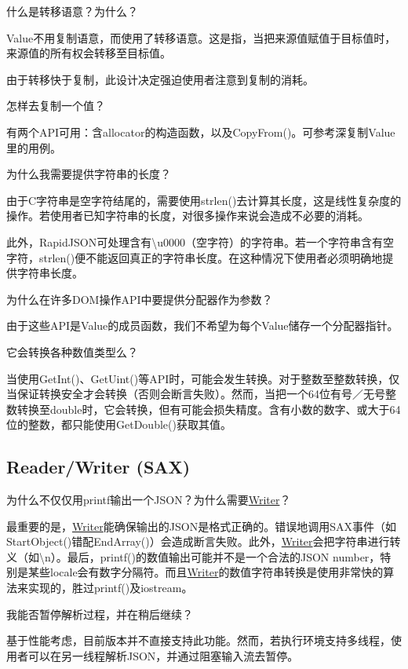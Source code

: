 \begin{DoxyEnumerate}
\item 什么是转移语意？为什么？

{\ttfamily Value}不用复制语意，而使用了转移语意。这是指，当把来源值赋值于目标值时，来源值的所有权会转移至目标值。

由于转移快于复制，此设计决定强迫使用者注意到复制的消耗。
\item 怎样去复制一个值？

有两个\+A\+P\+I可用：含allocator的构造函数，以及{\ttfamily Copy\+From()}。可参考深复制\+Value里的用例。
\item 为什么我需要提供字符串的长度？

由于\+C字符串是空字符结尾的，需要使用{\ttfamily strlen()}去计算其长度，这是线性复杂度的操作。若使用者已知字符串的长度，对很多操作来说会造成不必要的消耗。

此外，\+Rapid\+J\+S\+O\+N可处理含有{\ttfamily \textbackslash{}u0000}（空字符）的字符串。若一个字符串含有空字符，{\ttfamily strlen()}便不能返回真正的字符串长度。在这种情况下使用者必须明确地提供字符串长度。
\item 为什么在许多\+D\+O\+M操作\+A\+P\+I中要提供分配器作为参数？

由于这些\+A\+P\+I是{\ttfamily Value}的成员函数，我们不希望为每个{\ttfamily Value}储存一个分配器指针。
\item 它会转换各种数值类型么？

当使用{\ttfamily Get\+Int()}、{\ttfamily Get\+Uint()}等\+A\+P\+I时，可能会发生转换。对于整数至整数转换，仅当保证转换安全才会转换（否则会断言失败）。然而，当把一个64位有号／无号整数转换至double时，它会转换，但有可能会损失精度。含有小数的数字、或大于64位的整数，都只能使用{\ttfamily Get\+Double()}获取其值。
\end{DoxyEnumerate}

\subsection*{Reader/\+Writer (S\+AX)}


\begin{DoxyEnumerate}
\item 为什么不仅仅用{\ttfamily printf}输出一个\+J\+S\+O\+N？为什么需要{\ttfamily \hyperlink{class_writer}{Writer}}？

最重要的是，{\ttfamily \hyperlink{class_writer}{Writer}}能确保输出的\+J\+S\+O\+N是格式正确的。错误地调用\+S\+A\+X事件（如{\ttfamily Start\+Object()}错配{\ttfamily End\+Array()}）会造成断言失败。此外，{\ttfamily \hyperlink{class_writer}{Writer}}会把字符串进行转义（如{\ttfamily \textbackslash{}n}）。最后，{\ttfamily printf()}的数值输出可能并不是一个合法的\+J\+S\+ON number，特别是某些locale会有数字分隔符。而且{\ttfamily \hyperlink{class_writer}{Writer}}的数值字符串转换是使用非常快的算法来实现的，胜过{\ttfamily printf()}及{\ttfamily iostream}。
\item 我能否暂停解析过程，并在稍后继续？

基于性能考虑，目前版本并不直接支持此功能。然而，若执行环境支持多线程，使用者可以在另一线程解析\+J\+S\+O\+N，并通过阻塞输入流去暂停。
\end{DoxyEnumerate}

